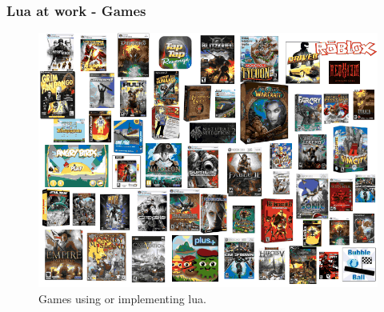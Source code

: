 \documentclass{beamer}
\begin{document}
\begin{frame}[fragile]
    \frametitle{Lua at work - Games}
    \begin{figure}
        \includegraphics[width=1\textwidth]{games}
        \caption{Games using or implementing lua.}
    \end{figure}
\end{frame}

\bgroup
    \begin{frame}[plain]{}
    \end{frame}
\egroup
\end{document}
